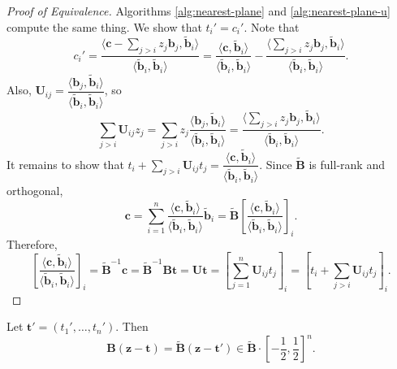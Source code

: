 \begin{proof}[Proof of Equivalence]
	Algorithms \ref{alg:nearest-plane} and \ref{alg:nearest-plane-u} compute the same thing. We show that $t_i' = c_i'$. Note that
	\[
		c_i' = \frac{\langle \mathbf{c} - \sum_{j>i} z_j \mathbf{b}_j, \mathbf{\tilde b}_i \rangle}{\langle \mathbf{\tilde b}_i, \mathbf{\tilde b}_i \rangle} = \frac{\langle \mathbf{c}, \mathbf{\tilde b}_i \rangle}{\langle \mathbf{\tilde b}_i, \mathbf{\tilde b}_i \rangle} - \frac{\langle \sum_{j>i} z_j \mathbf{b}_j, \mathbf{\tilde b}_i \rangle}{\langle \mathbf{\tilde b}_i, \mathbf{\tilde b}_i \rangle}.
	\]
	Also, $\mathbf{U}_{ij} = \dfrac{\langle \mathbf{b}_j, \mathbf{\tilde b}_i \rangle}{\langle \mathbf{\tilde b}_i, \mathbf{\tilde b}_i \rangle}$, so
	\[
		\sum_{j>i} \mathbf{U}_{ij} z_j = \sum_{j>i} z_j \frac{\langle \mathbf{b}_j, \mathbf{\tilde b}_i \rangle}{\langle \mathbf{\tilde b}_i, \mathbf{\tilde b}_i \rangle} = \frac{\langle \sum_{j>i} z_j \mathbf{b}_j, \mathbf{\tilde b}_i \rangle}{\langle \mathbf{\tilde b}_i, \mathbf{\tilde b}_i \rangle}.
	\]
	It remains to show that $t_i + \sum_{j>i} \mathbf{U}_{ij} t_j = \dfrac{\langle \mathbf{c}, \mathbf{\tilde b}_i \rangle}{\langle \mathbf{\tilde b}_i, \mathbf{\tilde b}_i \rangle}$. Since $\mathbf{\tilde B}$ is full-rank and orthogonal,
	\[
		\mathbf{c} = \sum_{i=1}^n \frac{\langle \mathbf{c}, \mathbf{\tilde b}_i \rangle}{\langle \mathbf{\tilde b}_i, \mathbf{\tilde b}_i \rangle} \mathbf{\tilde b}_i = \mathbf{\tilde B} \left[ \frac{\langle \mathbf{c}, \mathbf{\tilde b}_i \rangle}{\langle \mathbf{\tilde b}_i, \mathbf{\tilde b}_i \rangle} \right]_i.
	\]
	Therefore,
	\[
		\left[ \frac{\langle \mathbf{c}, \mathbf{\tilde b}_i \rangle}{\langle \mathbf{\tilde b}_i, \mathbf{\tilde b}_i \rangle} \right]_i = \mathbf{\tilde B}^{-1} \mathbf{c} = \mathbf{\tilde B}^{-1} \mathbf{B} \mathbf{t} = \mathbf{U}\mathbf{t} = \left[ \sum_{j=1}^n \mathbf{U}_{ij} t_j \right]_i = \left[ t_i + \sum_{j>i} \mathbf{U}_{ij} t_j \right]_i.
	\]
\end{proof}

\begin{corollary}
	\label{cor:thm1-alt}
	Let $\mathbf{t}' = (t_1', \dots, t_n')$. Then
	\[
		\mathbf{B}(\mathbf{z} - \mathbf{t}) = \mathbf{\tilde B}(\mathbf{z} - \mathbf{t}') \in \mathbf{\tilde B} \cdot \left[-\frac{1}{2}, \frac{1}{2}\right]^n.
	\]
\end{corollary}

